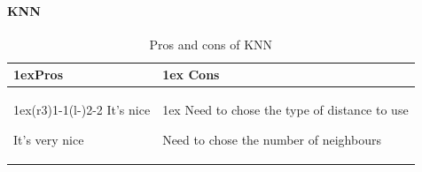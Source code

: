 \documentclass{article}
\begin{document}
        \paragraph{KNN}
        \begin{table}
        \begin{tabularx}{\linewidth}{>{\parskip1ex}X@{\kern4\tabcolsep}>{\parskip1ex}X}
        \toprule
        \hfil\bfseries Pros
        &
        \hfil\bfseries Cons
        \\\cmidrule(r{3\tabcolsep}){1-1}\cmidrule(l{-\tabcolsep}){2-2}
        It's nice\par
        It's very nice\par
        &
        Need to chose the type of distance to use\par
        Need to chose the number of neighbours\par
        \\\bottomrule
        \end{tabularx}
        \caption{Pros and cons of KNN}
        \end{table}
\end{document}
